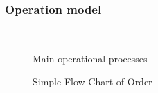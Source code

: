 \subsubsection{Operation model}
\label{ssub:operation_model}
\begin{figure}[htbp]
\centering
{}\\
\caption{Main operational processes}
\end{figure}

\begin{figure}[!h]
\centering\small
\resizebox{0.9\textwidth}{!}{}
\caption{Simple Flow Chart of Order}
\label{fig:simpleorderflow}
\end{figure}






